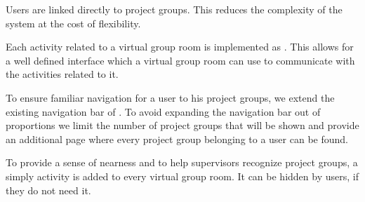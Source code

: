 Users are linked directly to project groups.
This reduces the complexity of the system at the cost of flexibility.

Each activity related to a virtual group room is implemented as \block{}.
This allows for a well defined interface which a virtual group room can use to communicate with the activities related to it.

To ensure familiar navigation for a user to his project groups, we extend the existing navigation bar of \moodle{}.
To avoid expanding the navigation bar out of proportions we limit the number of project groups that will be shown and provide an additional page where every project group belonging to a user can be found.

To provide a sense of nearness and to help supervisors recognize project groups, a simply activity is added to every virtual group room.
It can be hidden by users, if they do not need it.













\FloatBarrier